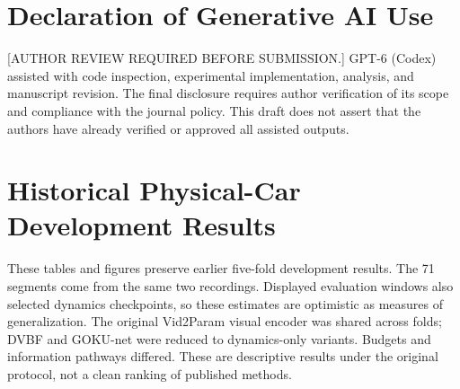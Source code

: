 \documentclass[preprint,12pt]{elsarticle}
\begin{document}
\section*{Declaration of Generative AI Use}
[AUTHOR REVIEW REQUIRED BEFORE SUBMISSION.] GPT-6 (Codex) assisted with code
inspection, experimental implementation, analysis, and manuscript revision.
The final disclosure requires author verification of its scope and compliance
with the journal policy. This draft does not assert that the authors have
already verified or approved all assisted outputs.

\appendix
\section{Historical Physical-Car Development Results}\label{sec:historical}
These tables and figures preserve earlier five-fold development results.
The 71 segments come from the same two recordings. Displayed evaluation windows
also selected dynamics checkpoints, so these estimates are optimistic as measures
of generalization. The original Vid2Param visual encoder was shared across folds;
DVBF and GOKU-net were reduced to dynamics-only variants. Budgets and information
pathways differed. These are descriptive results under the original protocol,
not a clean ranking of published methods.
\end{document}
